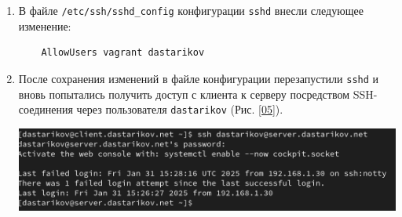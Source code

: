 \begin{enumerate}
\item В файле \texttt{/etc/ssh/sshd\_config} конфигурации \texttt{sshd} внесли следующее изменение:
  \begin{verbatim}
    AllowUsers vagrant dastarikov
  \end{verbatim}
\item После сохранения изменений в файле конфигурации перезапустили \texttt{sshd} и вновь попытались получить доступ с клиента к серверу посредством SSH-соединения через пользователя \texttt{dastarikov} (Рис. \ref{05}).
\begin{center}
  \centering
  \includegraphics[width=\textwidth]{../images/image05.png}
  \label{05}
\end{center}

\end{enumerate}
